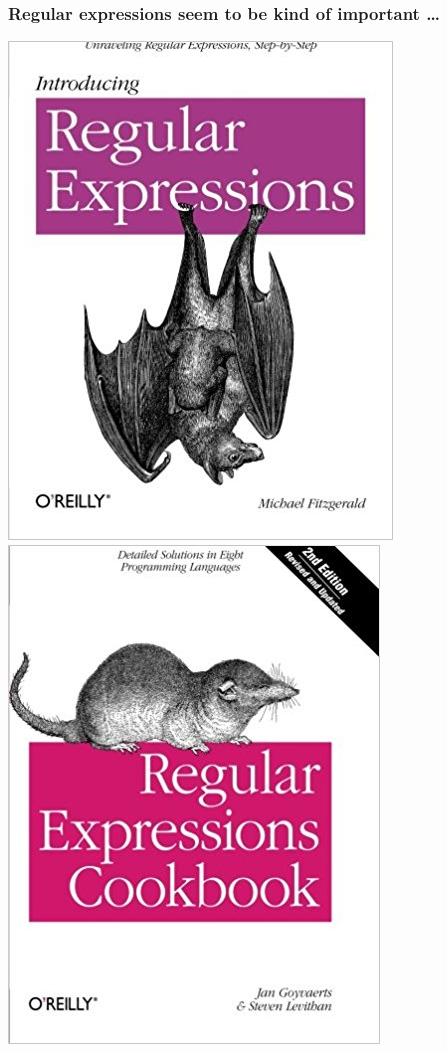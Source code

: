 \documentclass[pdftex]{beamer}
\begin{document}
\begin{frame}
  \frametitle{Regular expressions seem to be kind of important \dots}
  \begin{center}
    \includegraphics[scale=0.25]{book-introducing-regular-expressions}
    \includegraphics[scale=0.25]{book-regular-expression-cookbook}

\end{center}
\end{frame}
\end{document}
